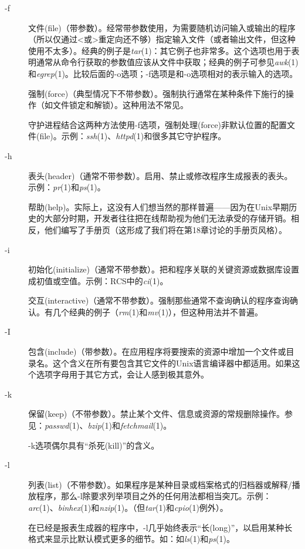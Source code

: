 \documentclass[12pt,oneside]{book}
\begin{document}
\begin{description}
\item[-f] 文件(file)（带参数）。经常带参数使用，为需要随机访问输入或输出的程序（所以仅通过<或>重定向还不够）指定输入文件（或者输出文件，但这种使用不太多）。经典的例子是\textit{tar}(1)：其它例子也非常多。这个选项也用于表明通常从命令行获取的参数值应该从文件中获取；经典的例子可参见\textit{awk}(1)和\textit{egrep}(1)。比较后面的-o选项；-f选项是和-o选项相对的表示输入的选项。

强制(force)（典型情况下不带参数）。强制执行通常在某种条件下施行的操作（如文件锁定和解锁）。这种用法不常见。

守护进程结合这两种方法使用-f选项，强制处理(force)非默认位置的配置文件(file)。示例：\textit{ssh}(1)、\textit{httpd}(1)和很多其它守护程序。

\item[-h] 表头(header)（通常不带参数）。启用、禁止或修改程序生成报表的表头。示例：\textit{pr}(1)和\textit{ps}(1)。

帮助(help)。实际上，这没有人们想当然的那样普遍——因为在Unix早期历史的大部分时期，开发者往往把在线帮助视为他们无法承受的存储开销。相反，他们编写了手册页（这形成了我们将在第18章讨论的手册页风格）。

\item[-i] 初始化(initialize)（通常不带参数）。把和程序关联的关键资源或数据库设置成初值或空值。示例：RCS中的\textit{ci}(1)。

交互(interactive)（通常不带参数）。强制那些通常不查询确认的程序查询确认。有几个经典的例子（\textit{rm}(1)和\textit{mv}(1)），但这种用法并不普遍。

\item[-I] 包含(include)（带参数）。在应用程序将要搜索的资源中增加一个文件或目录名。这个含义在所有要包含其它文件的Unix语言编译器中都适用。如果这个选项字母用于其它方式，会让人感到极其意外。

\item[-k] 保留(keep)（不带参数）。禁止某个文件、信息或资源的常规删除操作。参见：\textit{passwd}(1)、\textit{bzip}(1)和\textit{fetchmail}(1)。

-k选项偶尔具有“杀死(kill)”的含义。

\item[-l] 列表(list)（不带参数）。如果程序是某种目录或档案格式的归档器或解释/播放程序，那么-l除要求列举项目之外的任何用法都相当突兀。示例：\textit{arc}(1)、\textit{binhex}(1)和\textit{nzip}(1)。（但\textit{tar}(1)和\textit{cpio}(1)例外）。

在已经是报表生成器的程序中，-l几乎始终表示“长(long)”，以启用某种长格式来显示比默认模式更多的细节。如：如\textit{ls}(1)和\textit{ps}(1)。


\end{description}
\end{document}
